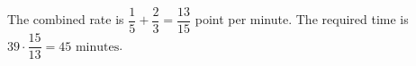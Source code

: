 The combined rate is $\dfrac{1}{5}+\dfrac{2}{3}=\dfrac{13}{15}$ point per minute. The required time is $39\cdot\dfrac{15}{13}=\boxed{45\text{ minutes}}$.
